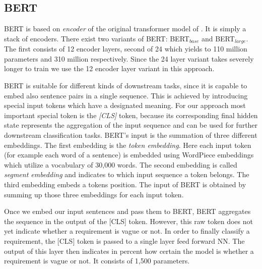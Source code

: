 \subsection{BERT}
\label{chp:approach:sec:models:subsec:BERT}

\Ac{BERT} is based on \textit{encoder} of the original transformer model of \textcite{Vaswani:2017}.
It is simply a stack of encoders.
There exist two variants of \ac{BERT}: \ac{BERT}$_{base}$ and \ac{BERT}$_{large}$.
The first consists of 12 encoder layers, second of 24 which yields to 110 million parameters and 310 million respectively.
Since the 24 layer variant takes severely longer to train we use the 12 encoder layer variant in this approach. \parencite{Devlin:2018}

\Ac{BERT} is suitable for different kinds of downstream tasks, since it is capable to embed also sentence pairs in a single sequence.
This is achieved by introducing special input tokens which have a designated meaning.
For our approach most important special token is the \textit{[CLS]} token, because its corresponding final hidden state represents the aggregation of the input sequence and can be used for further downstream classification tasks.
\Ac{BERT}'s input is the summation of three different embeddings.
The first embedding is the \textit{token embedding}.
Here each input token (for example each word of a sentence) is embedded using WordPiece embeddings \parencite{Wu:2016} which utilize a vocabulary of 30,000 words.
The second embedding is called \textit{segment embedding} and indicates to which input sequence a token belongs.
The third embedding embeds a tokens position.
The input of \ac{BERT} is obtained by summing up those three embeddings for each input token.

Once we embed our input sentences and pass them to \ac{BERT}, \ac{BERT} aggregates the sequence in the output of the [CLS] token.
However, this raw token does not yet indicate whether a requirement is vague or not.
In order to finally classify a requirement, the [CLS] token is passed to a single layer feed forward \ac{NN}.
The output of this layer then indicates in percent how certain the model is whether a requirement is vague or not.
It consists of 1,500 parameters.
